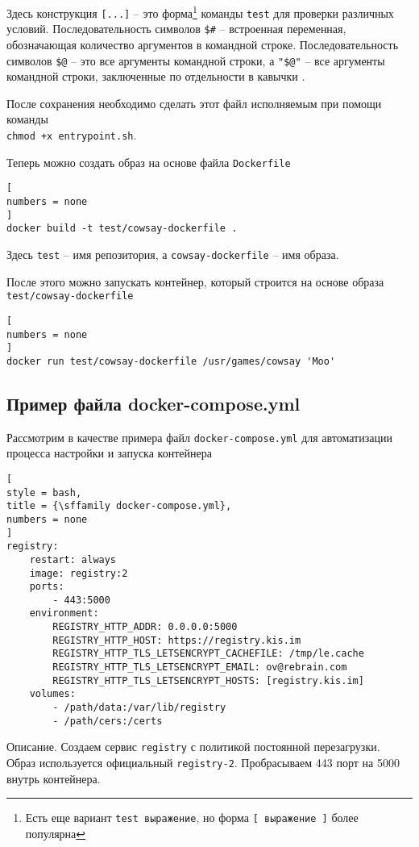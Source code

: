 \documentclass[%
	11pt,
	a4paper,
	utf8,
		]{article}
\begin{document}
Здесь конструкция \texttt{[...]} -- это форма\footnote{Есть еще вариант \texttt{test выражение}, но форма \texttt{[ выражение ]} более популярна} команды \texttt{test} для проверки различных условий. Последовательность символов \texttt{\$\#} -- встроенная переменная, обозначающая количество аргументов в командной строке. Последовательность символов \texttt{\$@} -- это все аргументы командной строки, а \texttt{"\$@"} -- все аргументы командной строки, заключенные по отдельности в кавычки \cite[]{robbins:bash-2017}.

После сохранения необходимо сделать этот файл исполняемым при помощи команды\\ \texttt{chmod +x entrypoint.sh}.

Теперь можно создать образ на основе файла \texttt{Dockerfile}
\begin{lstlisting}[
numbers = none
]
docker build -t test/cowsay-dockerfile .
\end{lstlisting}

Здесь \texttt{test} -- имя репозитория, а \texttt{cowsay-dockerfile} -- имя образа.

После этого можно запускать контейнер, который строится на основе образа \verb|test/cowsay-dockerfile|
\begin{lstlisting}[
numbers = none
]
docker run test/cowsay-dockerfile /usr/games/cowsay 'Moo'
\end{lstlisting}

\subsection{Пример файла docker-compose.yml}

Рассмотрим в качестве примера файл \texttt{docker-compose.yml} для автоматизации процесса настройки и запуска контейнера
\begin{lstlisting}[
style = bash,
title = {\sffamily docker-compose.yml},
numbers = none
]
registry:
    restart: always
    image: registry:2
    ports:
        - 443:5000
    environment:
        REGISTRY_HTTP_ADDR: 0.0.0.0:5000
        REGISTRY_HTTP_HOST: https://registry.kis.im
        REGISTRY_HTTP_TLS_LETSENCRYPT_CACHEFILE: /tmp/le.cache
        REGISTRY_HTTP_TLS_LETSENCRYPT_EMAIL: ov@rebrain.com
        REGISTRY_HTTP_TLS_LETSENCRYPT_HOSTS: [registry.kis.im]
    volumes:
        - /path/data:/var/lib/registry
        - /path/cers:/certs
\end{lstlisting}

Описание. Создаем сервис \texttt{registry} с политикой постоянной перезагрузки. Образ используется официальный \texttt{registry-2}. Пробрасываем 443 порт на 5000 внутрь контейнера.
\end{document}
